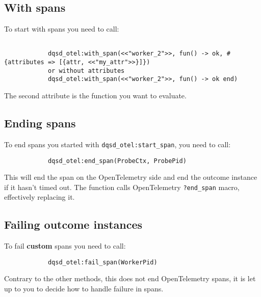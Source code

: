     \subsection{With spans}
        To start with spans you need to call:
        \begin{verbatim}

            dqsd_otel:with_span(<<"worker_2">>, fun() -> ok, #{attributes => [{attr, <<"my_attr">>}]})
            or without attributes
            dqsd_otel:with_span(<<"worker_2">>, fun() -> ok end)
        \end{verbatim}

        The second attribute is the function you want to evaluate.
    \subsection{Ending spans}
        To end spans you started with \texttt{dqsd\_otel:start\_span}, you need to call:
        \begin{verbatim}
            dqsd_otel:end_span(ProbeCtx, ProbePid)
        \end{verbatim}
        This will end the span on the OpenTelemetry side and end the outcome instance if it hasn't timed out.
        The function calls OpenTelemetry \texttt{?end\_span} macro, effectively replacing it.

    \subsection{Failing outcome instances}
        To fail \textbf{custom} spans you need to call:
        \begin{verbatim}
            dqsd_otel:fail_span(WorkerPid)
        \end{verbatim}
        Contrary to the other methods, this does not end OpenTelemetry spans, it is let up to you to decide how to handle failure in spans.


